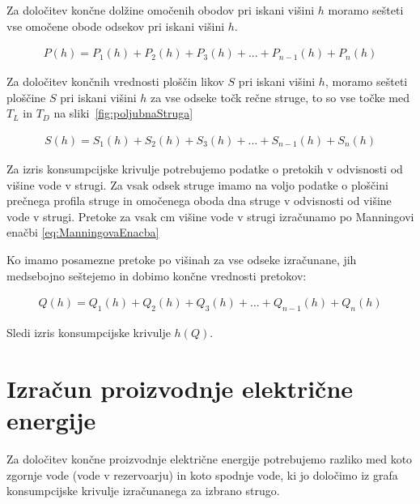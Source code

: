 Za določitev končne dolžine omočenih obodov pri iskani višini $h$ moramo sešteti vse omočene obode odsekov pri iskani višini $h$.
\begin{ceqn}
\begin{align}
P(h) = P_1(h) + P_2(h) + P_3(h) + ... + P_{n-1}(h) + P_n(h)
\end{align}
\end{ceqn}



Za določitev končnih vrednosti ploščin likov $S$ pri iskani višini $h$, moramo sešteti ploščine $S$ pri iskani višini $h$ za vse odseke točk rečne struge, to so vse točke med $T_L$ in $T_D$ na sliki~\ref{fig:poljubnaStruga}

\begin{ceqn}
\begin{align}
S(h) = S_1(h) + S_2(h) + S_3(h) + ... + S_{n-1}(h) + S_n(h)
\end{align}
\end{ceqn}





Za izris konsumpcijske krivulje potrebujemo podatke o pretokih v odvisnosti od višine vode v strugi. Za vsak odsek struge imamo na voljo podatke o ploščini prečnega profila struge in omočenega oboda dna struge v odvisnosti od višine vode v strugi. Pretoke za vsak cm višine vode v strugi izračunamo po Manningovi enačbi \ref{eq:ManningovaEnacba}


Ko imamo posamezne pretoke po višinah za vse odseke izračunane, jih medsebojno seštejemo in dobimo končne vrednosti pretokov:

\begin{ceqn}
\begin{align}
Q(h) = Q_1(h) + Q_2(h) + Q_3(h) + ... + Q_{n-1}(h) + Q_n(h)
\end{align}
\end{ceqn}

Sledi izris konsumpcijske krivulje $h(Q)$.




\newpage



\section{Izračun proizvodnje električne energije}
Za določitev končne proizvodnje električne energije potrebujemo razliko med koto zgornje vode (vode v rezervoarju) in koto spodnje vode, ki jo določimo iz grafa konsumpcijske krivulje izračunanega za izbrano strugo.

